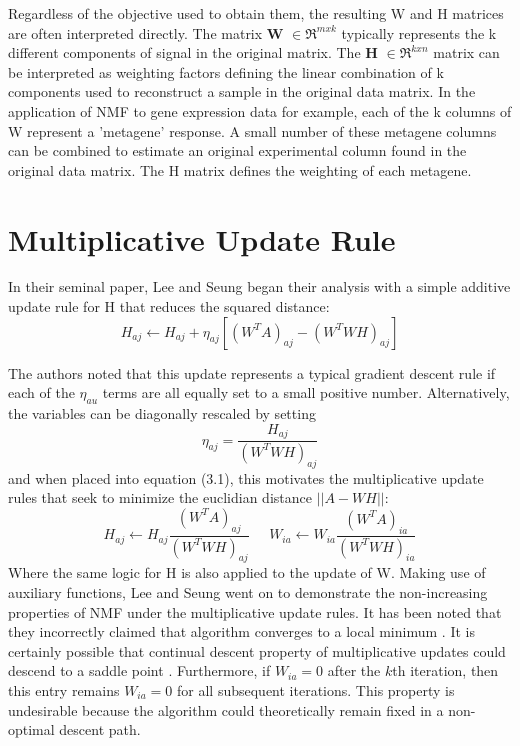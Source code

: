 \documentclass[final,leqno,onefignum,onetabnum]{siamltex1213}
\begin{document}
Regardless of the objective used to obtain them, the resulting W and H matrices are often interpreted directly. The matrix \textbf{W} $ \in \Re^{m x k}$ typically represents the k different components of signal in the original matrix. The \textbf{H} $ \in \Re^{k x n}$ matrix can be interpreted as weighting factors defining the linear combination of k components used to reconstruct a sample in the original data matrix. In the application of NMF to gene expression data for example, each of the k columns of W represent a 'metagene' response. A small number of these metagene columns can be combined to estimate an original experimental column found in the original data matrix. The H matrix defines the weighting of each metagene. 


\section{Multiplicative Update Rule} In their seminal paper, Lee and Seung began their analysis with a simple additive update rule for H that reduces the squared distance: 
\begin{equation}\label{au1}
 H_{aj} \leftarrow  H_{aj} + \eta_{aj} [ (W^T A)_{aj} - (W^T WH)_{aj}]
\end{equation}

The authors noted that this update represents a typical gradient descent rule if each of the $\eta_{au} $ terms are all equally set to a small positive number. Alternatively, the variables can be diagonally rescaled by setting
\begin{equation}\label{et1}
 \eta_{aj} = \frac{ H_{aj} }{(W^T WH)_{aj}}
\end{equation}
and when placed into equation (3.1), this motivates the multiplicative update rules that seek to minimize the euclidian distance $||A - WH ||$:
\begin{equation}\label{au1}
 H_{aj} \leftarrow  H_{aj} \frac{(W^T A)_{aj} }{ (W^T WH)_{aj} } \; \; \; \; \; W_{ia} \leftarrow  W_{ia} \frac{(W^T A)_{ia} }{ (W^T WH)_{ia} }
\end{equation}
Where the same logic for H is also applied to the update of W. Making use of auxiliary functions, Lee and Seung went on to demonstrate the non-increasing properties of NMF under the multiplicative update rules. It has been noted that they incorrectly claimed that algorithm converges to a local minimum \cite{Chu, Gon, Lin}. It is certainly possible that continual descent property of multiplicative updates could descend to a saddle point \cite{Ber}. Furthermore, if $W_{ia} = 0$ after the $k$th iteration, then this entry remains $W_{ia} = 0$ for all subsequent iterations. This property is undesirable because the algorithm could theoretically remain fixed in a non-optimal descent path. \\
\end{document}
